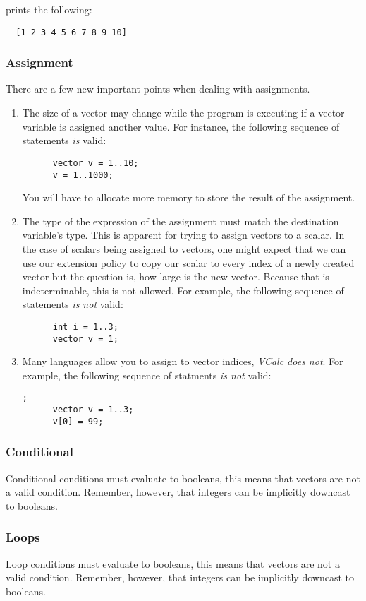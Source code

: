 \documentclass{article}
\begin{document}
prints the following:
\begin{lstlisting}
  [1 2 3 4 5 6 7 8 9 10]
\end{lstlisting}

\subsubsection{Assignment}
There are a few new important points when dealing with assignments.
\begin{enumerate}
  \item
    The size of a vector may change while the program is executing if a vector variable is assigned
    another value. For instance, the following sequence of statements \textit{is} valid:
    \begin{lstlisting}
      vector v = 1..10;
      v = 1..1000;
    \end{lstlisting}
    You will have to allocate more memory to store the result of the assignment.
  \item
    The type of the expression of the assignment must match the destination variable's type. This
    is apparent for trying to assign vectors to a scalar. In the case of scalars being assigned to
    vectors, one might expect that we can use our extension policy to copy our scalar to every index
    of a newly created vector but the question is, how large is the new vector. Because that is
    indeterminable, this is not allowed. For example, the following sequence of statements
    \textit{is not} valid:
    \begin{lstlisting}
      int i = 1..3;
      vector v = 1;
    \end{lstlisting}
  \item
    Many languages allow you to assign to vector indices, \textit{VCalc does not}. For example, the
    following sequence of statments \textit{is not} valid:
    \begin{lstlisting};
      vector v = 1..3;
      v[0] = 99;
    \end{lstlisting}
\end{enumerate}

\subsubsection{Conditional}
Conditional conditions must evaluate to booleans, this means that vectors are not a valid condition.
Remember, however, that integers can be implicitly downcast to booleans.

\subsubsection{Loops}
Loop conditions must evaluate to booleans, this means that vectors are not a valid condition.
Remember, however, that integers can be implicitly downcast to booleans.
\end{document}
